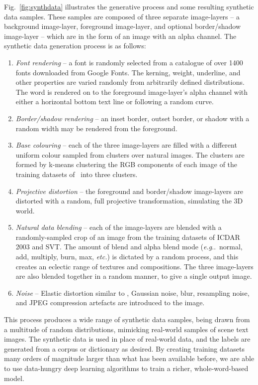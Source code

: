 \documentclass[twocolumn]{svjour3}          \smartqed  \usepackage{epsfig}
\makeatletter
\DeclareRobustCommand\onedot{\futurelet\@let@token\@onedot}
\def\@onedot{\ifx\@let@token.\else.\null\fi\xspace}
\def\eg{\emph{e.g}\onedot} \def\Eg{\emph{E.g}\onedot}
\makeatother
\begin{document}
Fig.~\ref{fig:synthdata} illustrates the generative process and some resulting synthetic data samples. These samples are composed of three separate image-layers -- a background image-layer, foreground image-layer, and optional border/shadow image-layer -- which are in the form of an image with an alpha channel. The synthetic data generation process is as follows:
\begin{enumerate}
  \item {\emph{Font rendering} -- a font is randomly selected from a catalogue of over 1400 fonts downloaded from Google Fonts. The kerning, weight, underline, and other properties are varied randomly from arbitrarily defined distributions. The word is rendered on to the foreground image-layer's alpha channel with either a horizontal bottom text line or following a random curve.}
  \item \emph{Border/shadow rendering} -- an inset border, outset border, or shadow with a random width may be rendered from the foreground.

\item \emph{Base colouring} -- each of the three image-layers are 
filled with a different uniform colour sampled
from clusters over natural images. The clusters are formed by
k-means clustering the RGB components of each image of the
training datasets of~\cite{ICDAR03} into three clusters.

  \item \emph{Projective distortion} -- the foreground and border/shadow image-layers are distorted with a random, full projective transformation, simulating the 3D world.
  \item \emph{Natural data blending} -- each of the image-layers are blended with a randomly-sampled crop of an image from the training datasets of ICDAR 2003 and SVT. The amount of blend and alpha blend mode (\eg~normal, add, multiply, burn, max, \emph{etc.}) is dictated by a random process, and this creates an eclectic range of textures and compositions. The three image-layers are also blended together in a random manner, to give a single output image.
  \item \emph{Noise} -- Elastic distortion similar to \cite{Simard03}, Gaussian noise, blur, resampling noise, and JPEG compression artefacts are introduced to the image.
\end{enumerate}

This process produces a wide range of synthetic data samples, being drawn from a multitude of random distributions, mimicking real-world samples of scene text images. The synthetic data is used in place of real-world data, and the labels are generated from a corpus or dictionary as desired. By creating training datasets many orders of magnitude larger than what has been available before, we are able to use data-hungry deep learning algorithms to train a richer, whole-word-based model.
\end{document}
